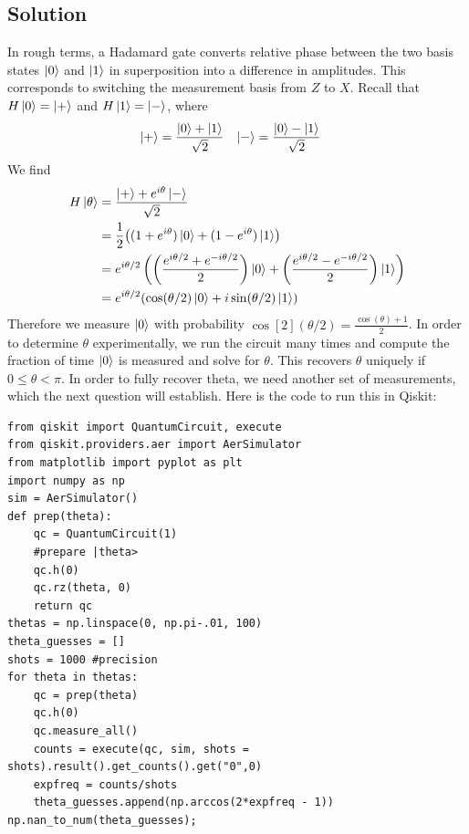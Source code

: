\documentclass{article}
\begin{document}
{\subsection*{Solution}
In rough terms, a Hadamard gate converts relative phase between the two basis states $\ket{0}$ and $\ket{1}$ in superposition into a difference in amplitudes. This corresponds to switching the measurement basis from $Z$ to $X$. Recall that $H \ket{0} = \ket{+}$ and $H \ket{1} = \ket{-}$, where
\begin{align*}
\ket{+} &= \frac{\ket{0} + \ket{1}}{\sqrt{2}} & \ket{-} &= \frac{\ket{0} - \ket{1}}{\sqrt{2}}
\end{align*}
We find
\begin{align*}
H\ket{\theta} &= \frac{\ket{+}+ e^{i\theta}\ket{-}}{\sqrt{2}} \\
&= \frac{1}{2}\qty((1+e^{i\theta})\ket{0} + (1-e^{i\theta})\ket{1}) \\
&= e^{i\theta/2}\left(\left(\frac{e^{i\theta/2}+ e^{-i\theta/2}}{2}\right)\ket{0} + \left(\frac{e^{i\theta/2}-e^{-i\theta/2}}{2}\right)\ket{1}\right) \\
&= e^{i\theta/2}(\cos(\theta/2)\ket{0} + i\sin(\theta/2)\ket{1})
\end{align*}
Therefore we measure $\ket{0}$ with probability $\cos[2](\theta/2) = \frac{\cos(\theta)+1}{2}$. In order to determine $\theta$ experimentally, we run the circuit many times and compute the fraction of time $\ket{0}$ is measured and solve for $\theta$. This recovers $\theta$ uniquely if $0 \leq \theta < \pi$. In order to fully recover theta, we need another set of measurements, which the next question will establish. Here is the code to run this in Qiskit:
\begin{verbatim}
from qiskit import QuantumCircuit, execute
from qiskit.providers.aer import AerSimulator
from matplotlib import pyplot as plt
import numpy as np
sim = AerSimulator()
def prep(theta):
    qc = QuantumCircuit(1)
    #prepare |theta>
    qc.h(0)
    qc.rz(theta, 0)
    return qc
thetas = np.linspace(0, np.pi-.01, 100)
theta_guesses = []
shots = 1000 #precision
for theta in thetas:
    qc = prep(theta)
    qc.h(0)
    qc.measure_all()
    counts = execute(qc, sim, shots = shots).result().get_counts().get("0",0)
    expfreq = counts/shots
    theta_guesses.append(np.arccos(2*expfreq - 1))
np.nan_to_num(theta_guesses);
\end{verbatim}
\begin{centering}
    \begin{figure}[hbt!]
        \centering

\end{figure}
\end{centering}}
\end{document}
